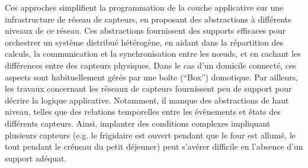 Ces approches simplifient la programmation de la couche applicative sur une 
infrastructure de réseau de capteurs, en proposant des abstractions à différents 
niveaux de ce réseau.
Ces abstractions fournissent des supports efficaces pour orchestrer un
système distribué hétérogène, en aidant dans la répartition des
calculs, la communication et la synchronisation entre les n{\oe}uds, et
en cachant les différences entre des capteurs physiques.  Dans le cas
d'un domicile connecté, ces aspects sont habituellement gérés par une
boîte (``Box'') domotique.  Par ailleurs, les travaux concernant les
réseaux de capteurs fournissent peu de support pour décrire la logique
applicative. Notamment, il manque des abstractions de haut niveau,
telles que des relations temporelles entre les évènements et états des
différents capteurs. Ainsi, implanter des conditions complexes
impliquant plusieurs capteurs (e.g. le frigidaire est ouvert pendant
que le four est allumé, le tout pendant le créneau du petit déjeuner)
peut s'avérer difficile en l'absence d'un support adéquat.


